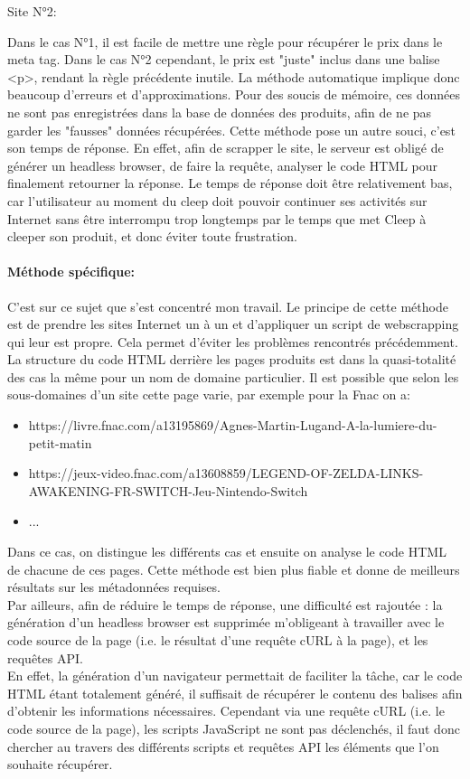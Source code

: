 \documentclass{article} %
\begin{document}
Site N°2:


Dans le cas N°1, il est facile de mettre une règle pour récupérer le prix dans le meta tag. Dans le cas N°2 cependant, le prix est "juste" inclus dans une balise <p>, rendant la règle précédente inutile. La méthode automatique implique donc beaucoup d'erreurs et d'approximations. Pour des soucis de mémoire, ces données ne sont pas enregistrées dans la base de données des produits, afin de ne pas garder les "fausses" données récupérées.
Cette méthode pose un autre souci, c'est son temps de réponse. En effet, afin de scrapper le site, le serveur est obligé de générer un headless browser, de faire la requête, analyser le code HTML pour finalement retourner la réponse. Le temps de réponse doit être relativement bas, car l'utilisateur au moment du cleep doit pouvoir continuer ses activités sur Internet sans être interrompu trop longtemps par le temps que met Cleep à cleeper son produit, et donc éviter toute frustration.

\paragraph{Méthode spécifique:\\}
C'est sur ce sujet que s'est concentré mon travail. Le principe de cette méthode est de prendre les sites Internet un à un et d'appliquer un script de webscrapping qui leur est propre. Cela permet d'éviter les problèmes rencontrés précédemment.
La structure du code HTML derrière les pages produits est dans la quasi-totalité des cas la même pour un nom de domaine particulier. Il est possible que selon les sous-domaines d'un site cette page varie, par exemple pour la Fnac on a:
\begin{itemize}
 \itemsep 0em
 \item https://livre.fnac.com/a13195869/Agnes-Martin-Lugand-A-la-lumiere-du-petit-matin
 \item https://jeux-video.fnac.com/a13608859/LEGEND-OF-ZELDA-LINKS-AWAKENING-FR-SWITCH-Jeu-Nintendo-Switch
 \item ...
\end{itemize}
Dans ce cas, on distingue les différents cas et ensuite on analyse le code HTML de chacune de ces pages. Cette méthode est bien plus fiable et donne de meilleurs résultats sur les métadonnées requises.\\
Par ailleurs, afin de réduire le temps de réponse, une difficulté est rajoutée : la génération d'un headless browser est supprimée m'obligeant à travailler avec le code source de la page (i.e. le résultat d'une requête cURL à la page), et les requêtes API.\\
En effet, la génération d'un navigateur permettait de faciliter la tâche, car le code HTML étant totalement généré, il suffisait de récupérer le contenu des balises afin d'obtenir les informations nécessaires. Cependant via une requête cURL (i.e. le code source de la page), les scripts JavaScript ne sont pas déclenchés, il faut donc chercher au travers des différents scripts et requêtes API les éléments que l'on souhaite récupérer.
\end{document}
